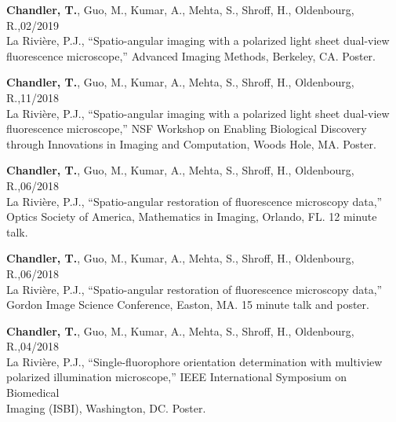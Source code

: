 \documentclass[12pt,letterpaper]{article}
\begin{document}
\begin{benumerate}{11}
\item {\textbf{Chandler, T.}, Guo, M., Kumar, A., Mehta, S., Shroff, H., Oldenbourg, R.,\hfill 02/2019\\ La Rivi\`ere, P.J., ``Spatio-angular imaging with a polarized light sheet dual-view\\ fluorescence microscope,'' Advanced Imaging Methods, Berkeley, CA. Poster.}

\item {\textbf{Chandler, T.}, Guo, M., Kumar, A., Mehta, S., Shroff, H., Oldenbourg, R.,\hfill 11/2018\\ La Rivi\`ere, P.J., ``Spatio-angular imaging with a polarized light sheet dual-view \\ fluorescence microscope,'' NSF Workshop on Enabling Biological Discovery\\ through Innovations in Imaging and Computation, Woods Hole, MA. Poster.}
  
\item {\textbf{Chandler, T.}, Guo, M., Kumar, A., Mehta, S., Shroff, H., Oldenbourg, R.,\hfill 06/2018\\ La Rivi\`ere, P.J., ``Spatio-angular restoration of fluorescence microscopy data,'' \\
      Optics Society of America, Mathematics in Imaging, Orlando, FL. 12 minute talk.}
  
\item {\textbf{Chandler, T.}, Guo, M., Kumar, A., Mehta, S., Shroff, H., Oldenbourg, R.,\hfill 06/2018\\ La Rivi\`ere, P.J., ``Spatio-angular restoration of fluorescence microscopy data,''\\
      Gordon Image Science Conference, Easton, MA. 15 minute talk and poster.}

\item {\textbf{Chandler, T.}, Guo, M., Kumar, A., Mehta, S., Shroff, H., Oldenbourg, R.,\hfill 04/2018\\ La Rivi\`ere, P.J., ``Single-fluorophore orientation determination with multiview\\ polarized
      illumination microscope,'' IEEE International Symposium on Biomedical\\ Imaging (ISBI), Washington, DC. Poster.}
\end{benumerate}
\end{document}
